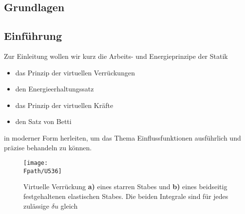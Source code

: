 \textcolor{chapterTitleBlue}{\chapter{Grundlagen}}
{\textcolor{sectionTitleBlue}{\section{Einf\"{u}hrung}}
Zur Einleitung wollen wir kurz die Arbeits- und Energieprinzipe der Statik\\

\begin{itemize}
  \item das Prinzip der virtuellen Verr\"{u}ckungen
  \item den Energieerhaltungssatz
  \item das Prinzip der virtuellen Kr\"{a}fte
  \item den Satz von Betti
\end{itemize}

in moderner Form herleiten, um das Thema Einflussfunktionen ausf\"{u}hrlich und pr\"{a}zise behandeln zu k\"{o}nnen.
\begin{figure}[tbp]
\centering
\if {} \sidecaption \fi
\texttt{[image: \\Fpath/U536]}
\caption{ Virtuelle Verr\"{u}ckung \textbf{ a)} eines starren Stabes und \textbf{ b)} eines beidseitig festgehaltenen elastischen Stabes. Die beiden Integrale sind f\"{u}r jedes zul\"{a}ssige $\delta u $ gleich} \label{U536}
%
\end{figure}%

}
